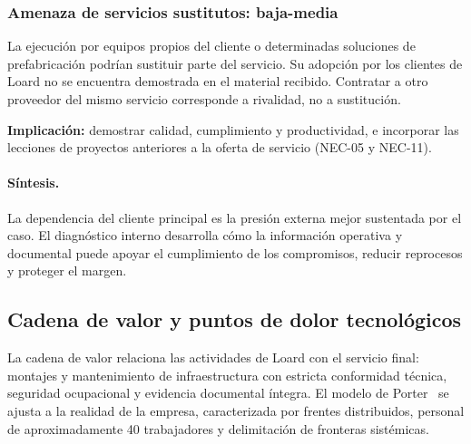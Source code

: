 \documentclass[12pt,letterpaper]{article}
\begin{document}
\subsubsection{Amenaza de servicios sustitutos: baja-media}
La ejecución por equipos propios del cliente o determinadas soluciones de prefabricación podrían sustituir parte del servicio. Su adopción por los clientes de Loard no se encuentra demostrada en el material recibido. Contratar a otro proveedor del mismo servicio corresponde a rivalidad, no a sustitución.

\textbf{Implicación:} demostrar calidad, cumplimiento y productividad, e incorporar las lecciones de proyectos anteriores a la oferta de servicio (NEC-05 y NEC-11).

\paragraph{Síntesis.}
La dependencia del cliente principal es la presión externa mejor sustentada por el caso. El diagnóstico interno desarrolla cómo la información operativa y documental puede apoyar el cumplimiento de los compromisos, reducir reprocesos y proteger el margen.

\subsection{Cadena de valor y puntos de dolor tecnológicos}
\label{sec:cadena-loard}

La cadena de valor relaciona las actividades de Loard con el servicio final: montajes y mantenimiento de infraestructura con estricta conformidad técnica, seguridad ocupacional y evidencia documental íntegra. El modelo de Porter~\cite{hbs-cadena-valor} se ajusta a la realidad de la empresa, caracterizada por frentes distribuidos, personal de aproximadamente 40 trabajadores y delimitación de fronteras sistémicas.
\end{document}
